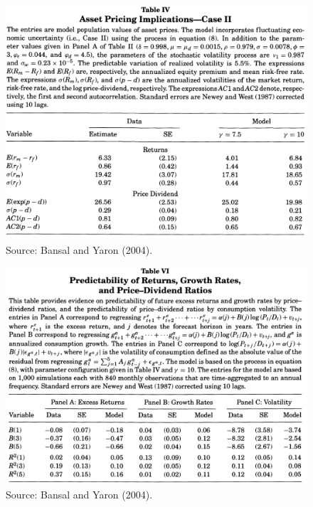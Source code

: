 \documentclass[
  12pt,
]{book}
\theoremstyle{definition}
\theoremstyle{definition}
\theoremstyle{definition}
\theoremstyle{definition}
\theoremstyle{remark}
\begin{document}
\begin{figure}

{\centering \includegraphics[width=1\linewidth]{figures/table_BY4} 

}

\caption{Source: Bansal and Yaron (2004).}\label{fig:BY3}
\end{figure}

\begin{figure}

{\centering \includegraphics[width=1\linewidth]{figures/table_BY6} 

}

\caption{Source: Bansal and Yaron (2004).}\label{fig:BY4}
\end{figure}
\end{document}
